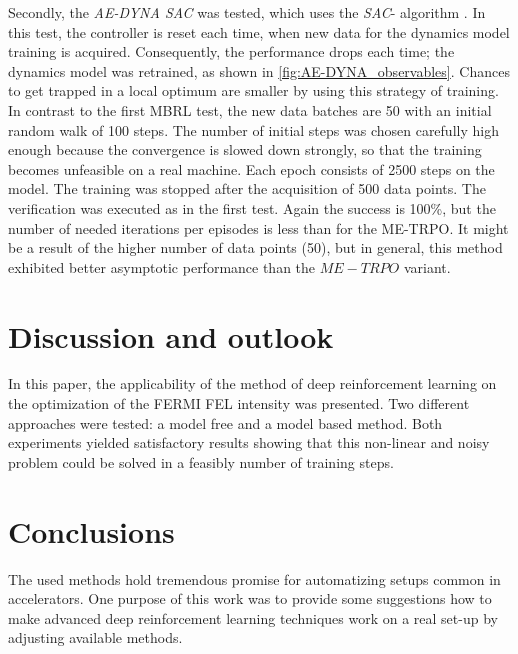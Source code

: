 \documentclass[
reprint,
amsmath,amssymb,amsfonts,clevref,
aps,
prstab,
]{revtex4-2}
\begin{document}
	Secondly, the \emph{AE-DYNA SAC} was tested, which uses the \emph{SAC}- algorithm \cite{Haarnoja2018a}. In this test, the controller is reset each time, when new data for the dynamics model training is acquired. Consequently, the performance drops each time; the dynamics model was retrained, as shown in \cref{fig:AE-DYNA_observables}. Chances to get trapped in a local optimum are smaller by using this strategy of training.\\
	In contrast to the first MBRL test, the new data batches are 50 with an initial random walk of 100 steps. The number of initial steps was chosen carefully high enough because the convergence is slowed down strongly, so that the training becomes unfeasible on a real machine. Each epoch consists of 2500 steps on the model. The training was stopped after the acquisition of 500 data points. The verification was executed as in the first test. Again the success is 100\%, but the number of needed iterations per episodes is less than for the ME-TRPO. It might be a result of the higher number of data points (50), but in general, this method exhibited better asymptotic performance than the $ME-TRPO$ variant.

	
	\section{Discussion and outlook}
	In this paper, the applicability of the method of deep reinforcement learning on the optimization of the FERMI FEL intensity was presented. Two different approaches were tested: a model free and a model based method. Both experiments yielded satisfactory results showing that this non-linear and noisy problem could be solved in a feasibly number of training steps.\\

	\section{Conclusions}
		 The used methods hold tremendous promise for automatizing setups common in accelerators. One purpose of this work was to provide some suggestions how to make advanced deep reinforcement learning techniques work on a real set-up by adjusting available methods.  
	\newpage
	\appendix
\end{document}

